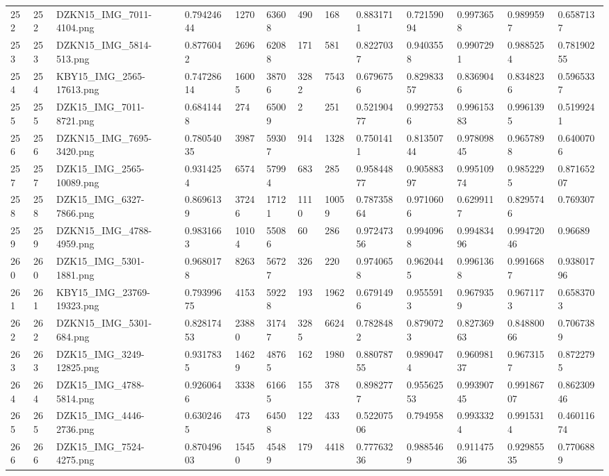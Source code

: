 \documentclass[11pt, a4paper, twoside]{report}
\begin{document}
\begin{longtable}[c]{@{}lllllllllllll@{}}
252 & 252 & DZKN15\_IMG\_7011-4104.png & 0.79424644 & 1270 & 63608 & 490 & 168 & 0.8831711 & 0.72159094 & 0.9973658 & 0.9899597 & 0.6587137 \\
253 & 253 & DZKN15\_IMG\_5814-513.png & 0.8776042 & 2696 & 62088 & 171 & 581 & 0.8227037 & 0.9403558 & 0.9907291 & 0.9885254 & 0.78190255 \\
254 & 254 & KBY15\_IMG\_2565-17613.png & 0.74728614 & 16005 & 38706 & 3282 & 7543 & 0.6796756 & 0.82983357 & 0.8369046 & 0.8348236 & 0.5965337 \\
255 & 255 & DZK15\_IMG\_7011-8721.png & 0.6841448 & 274 & 65009 & 2 & 251 & 0.52190477 & 0.9927536 & 0.99615383 & 0.9961395 & 0.5199241 \\
256 & 256 & DZKN15\_IMG\_7695-3420.png & 0.78054035 & 3987 & 59307 & 914 & 1328 & 0.7501411 & 0.81350744 & 0.97809845 & 0.9657898 & 0.6400706 \\
257 & 257 & DZK15\_IMG\_2565-10089.png & 0.9314254 & 6574 & 57994 & 683 & 285 & 0.95844877 & 0.90588397 & 0.99510974 & 0.9852295 & 0.87165207 \\
258 & 258 & DZK15\_IMG\_6327-7866.png & 0.8696139 & 37246 & 17121 & 1110 & 10059 & 0.78735864 & 0.9710606 & 0.6299117 & 0.8295746 & 0.769307 \\
259 & 259 & DZKN15\_IMG\_4788-4959.png & 0.9831663 & 10104 & 55086 & 60 & 286 & 0.97247356 & 0.9940968 & 0.99483496 & 0.99472046 & 0.96689 \\
260 & 260 & DZK15\_IMG\_5301-1881.png & 0.9680178 & 8263 & 56727 & 326 & 220 & 0.9740658 & 0.9620445 & 0.9961368 & 0.9916687 & 0.93801796 \\
261 & 261 & KBY15\_IMG\_23769-19323.png & 0.79399675 & 4153 & 59228 & 193 & 1962 & 0.6791496 & 0.9555913 & 0.9679359 & 0.9671173 & 0.6583703 \\
262 & 262 & DZKN15\_IMG\_5301-684.png & 0.82817453 & 23880 & 31747 & 3285 & 6624 & 0.7828482 & 0.8790723 & 0.82736963 & 0.84880066 & 0.7067389 \\
263 & 263 & DZK15\_IMG\_3249-12825.png & 0.9317835 & 14629 & 48765 & 162 & 1980 & 0.88078755 & 0.9890474 & 0.96098137 & 0.9673157 & 0.8722795 \\
264 & 264 & DZK15\_IMG\_4788-5814.png & 0.9260646 & 3338 & 61665 & 155 & 378 & 0.8982777 & 0.95562553 & 0.99390745 & 0.99186707 & 0.86230946 \\
265 & 265 & DZK15\_IMG\_4446-2736.png & 0.6302465 & 473 & 64508 & 122 & 433 & 0.52207506 & 0.794958 & 0.9933324 & 0.9915314 & 0.46011674 \\
266 & 266 & DZK15\_IMG\_7524-4275.png & 0.87049603 & 15450 & 45489 & 179 & 4418 & 0.77763236 & 0.9885469 & 0.91147536 & 0.92985535 & 0.7706889 \\

\end{longtable}
\end{document}
